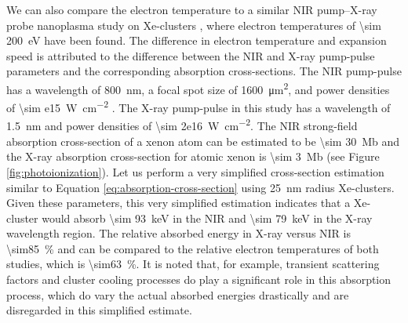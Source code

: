 We can also compare the electron temperature to a similar NIR pump--X-ray probe nanoplasma study on Xe-clusters \cite{Gorkhover-2016-NatPho}, where electron temperatures of \SI{\sim 200}{\electronvolt} have been found. The difference in electron temperature and expansion speed is attributed to the difference between the NIR and X-ray pump-pulse parameters and the corresponding absorption cross-sections. The NIR pump-pulse has a wavelength of \SI{800}{\nano\meter}, a focal spot size of \SI{1600}{\micro\meter\squared}, and power densities of \SI{\sim e15}{\watt\per\square\centi\meter} \cite{Gorkhover-2016-NatPho}. The X-ray pump-pulse in this study has a wavelength of \SI{1.5}{\nano\meter} and power densities of \SI{\sim 2e16}{\watt\per\square\centi\meter}. The NIR strong-field absorption cross-section of a xenon atom can be estimated to be \SI{\sim 30}{\mega\barn} \cite{Fennel-2010-RMP} and the X-ray absorption cross-section for atomic xenon is \SI{\sim 3}{\mega\barn} (see Figure \ref{fig:photoionization}). Let us perform a very simplified cross-section estimation similar to Equation \eqref{eq:absorption-cross-section} using \SI{25}{\nano\meter} radius Xe-clusters. Given these parameters, this very simplified estimation indicates that a Xe-cluster would absorb \SI{\sim 93}{\kilo\electronvolt} in the NIR and \SI{\sim 79}{\kilo\electronvolt} in the X-ray wavelength region. The relative absorbed energy in X-ray versus NIR is \SI{\sim85}{\percent} and can be compared to the relative electron temperatures of both studies, which is \SI{\sim63}{\percent}. It is noted that, for example, transient scattering factors and cluster cooling processes \cite{Fennel-2010-RMP} do play a significant role in this absorption process, which do vary the actual absorbed energies drastically \cite{Fennel-2010-RMP} and are disregarded in this simplified estimate.\\[1\baselineskip]
